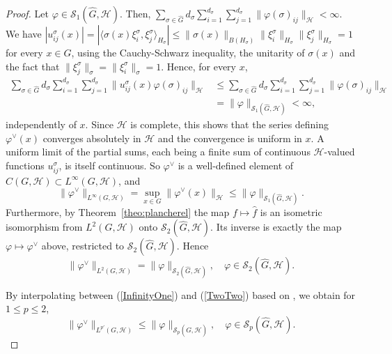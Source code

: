 \documentclass[10pt,a4paper]{amsart}
\begin{document}
\begin{proof}
 Let $\varphi\in\mathscr
S_1(\widehat{G},\mathcal{H})$. Then,  $\sum\limits_{\sigma\in\widehat{G}}d_\sigma\sum\limits_{i=1}^{d_\sigma}\sum\limits_{j=1}^{d_\sigma}\|\varphi(\sigma)_{ij}\|_\mathcal{H}<\infty$.
We have   $|u^\sigma_{ij}(x)|=|\langle\sigma(x)\xi_i^\sigma,
\xi_j^\sigma\rangle_{H_\sigma}|\le\|\sigma(x)\|_{B(H_\sigma)}\|\xi_i^\sigma\|_{H_\sigma}\|\xi_j^\sigma\|_{H_\sigma}=1$
for every $x\in G$, using  the Cauchy-Schwarz inequality, the unitarity of $\sigma(x)$ and the fact that  $\|\xi_j^\sigma\|_\sigma=\|\xi_i^\sigma\|_\sigma
=1$. Hence, for every $x$,
\begin{align*}
\sum_{\sigma\in\widehat{G}}d_\sigma\sum_{i=1}^{d_\sigma}\sum_{j=1}^{d_\sigma}\big\|u^\sigma_{ij}(x)\varphi(\sigma)_{ij}\big\|_\mathcal{H}&\le
\sum_{\sigma\in\widehat{G}}d_\sigma\sum_{i=1}^{d_\sigma}\sum_{j=1}^{d_\sigma}\|\varphi(\sigma)_{ij}\|_\mathcal{H}\\
&=\|\varphi\|_{\mathscr{S}_1(\widehat{G},\mathcal{H})}
<\infty,
\end{align*}
independently of $x$. Since $\mathcal{H}$ is complete, this shows that the series defining
$\varphi^\vee(x)$ converges absolutely in $\mathcal{H}$  and the convergence is
uniform in $x$. A uniform limit of the
partial sums, each being a finite sum of continuous $\mathcal{H}$-valued functions $u^\sigma_{ij}$, is itself continuous. So $\varphi^\vee$ is a well-defined element of $C(G,\mathcal{H})\subset
L^\infty(G,\mathcal{H})$, and
\begin{equation}\label{InfinityOne}
\|\varphi^\vee\|_{L^\infty(G,\mathcal{H})}=\sup_{x\in G}\|\varphi^\vee(x)\|_\mathcal{H}\le
\|\varphi\|_{\mathscr{S}_1(\widehat{G},\mathcal{H})}.
\end{equation}
Furthermore,  by Theorem~\ref{theo:plancherel}  the
map $f\mapsto\widehat f$ is an isometric isomorphism from $L^2(G,\mathcal{H})$ onto $\mathscr{S}_2(\widehat{G},\mathcal{H})$.
Its inverse is exactly the map $\varphi\mapsto\varphi^\vee$ above, restricted to $\mathscr{S}_2(\widehat{G},\mathcal{H})$. Hence
\begin{equation}\label{TwoTwo}
\|\varphi^\vee\|_{L^2(G,\mathcal{H})}=\|\varphi\|_{\mathscr{S}_2(\widehat{G},\mathcal{H})},\quad
\varphi\in\mathscr{S}_2(\widehat{G},\mathcal{H}).
\end{equation}

 By interpolating between (\ref{InfinityOne}) and (\ref{TwoTwo}) based on  \cite[Theorem 5.1.2]{BerghLofstrom},   
we obtain for $1\le p\le 2$,
$$
\|\varphi^\vee\|_{L^{p'}(G,\mathcal{H})}\le\|\varphi\|_{\mathscr{S}_p(\widehat{G},\mathcal{H})},\quad
\varphi\in\mathscr{S}_p(\widehat{G},\mathcal{H}).
$$
\end{proof}
\end{document}
